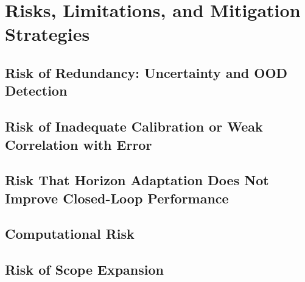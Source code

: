 \documentclass[12pt,a4paper]{report}
\begin{document}

\chapter{Risks, Limitations, and Mitigation Strategies}

\section{Risk of Redundancy: Uncertainty and OOD Detection}


\section{Risk of Inadequate Calibration or Weak Correlation with Error}


\section{Risk That Horizon Adaptation Does Not Improve Closed-Loop Performance}


\section{Computational Risk}


\section{Risk of Scope Expansion}
\end{document}
